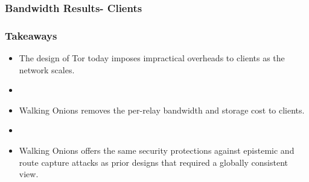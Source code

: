 \documentclass[hyperref={pdfpagelabels=true},table,dvipsnames,14pt,aspectratio=169]{beamer}
\begin{document}
\begin{frame}
\frametitle{Bandwidth Results- Clients}
\begin{center}
  \hspace{-1.3cm}
  \begin{minipage}[t] {0.45\linewidth}
    \vspace*{8em}
  \end{minipage}
  \hspace{0.8cm}
  \begin{minipage}[t] {0.45\linewidth}
    \vspace*{8em}
  \end{minipage}
\end{center}
\end{frame}

\begin{frame}
\frametitle{Takeaways}
  \begin{itemize}
    \item The design of Tor today imposes impractical overheads to clients as
      the network scales.
    \item[]~
    \item Walking Onions removes the per-relay bandwidth and storage cost to
      clients.
    \item[]~
    \item Walking Onions offers the same security protections against epistemic
      and route capture attacks as prior designs that required a globally
      consistent view.
  \end{itemize}
\end{frame}
\end{document}
